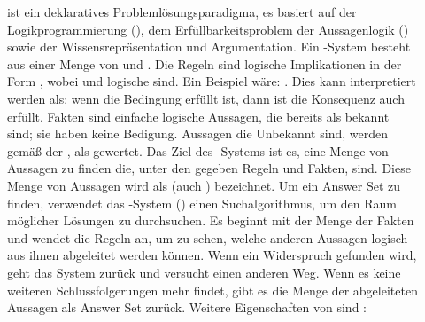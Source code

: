 \begin{description}
    \item[] ist ein deklaratives Problemlösungsparadigma, es basiert auf der Logikprogrammierung (), dem Erfüllbarkeitsproblem der Aussagenlogik () sowie der Wissensrepräsentation und Argumentation.
    Ein -System besteht aus einer Menge von  und .
    Die Regeln sind logische Implikationen in der Form , wobei  und  logische  sind.
    Ein Beispiel wäre: .
    Dies kann interpretiert werden als: wenn die Bedingung  erfüllt ist, dann ist die Konsequenz  auch erfüllt.
    Fakten sind einfache logische Aussagen, die bereits als  bekannt sind; sie haben keine Bedigung.
    Aussagen die Unbekannt sind, werden gemäß der , als  gewertet.
    Das Ziel des -Systems ist es, eine Menge von Aussagen zu finden die, unter den gegeben Regeln und Fakten,  sind.
    Diese Menge von Aussagen wird als  (auch ) bezeichnet.
    Um ein Answer Set zu finden, verwendet das -System () einen Suchalgorithmus, um den Raum möglicher Lösungen zu durchsuchen.
    Es beginnt mit der Menge der Fakten und wendet die Regeln an, um zu sehen, welche anderen Aussagen logisch aus ihnen abgeleitet werden können.
    Wenn ein Widerspruch gefunden wird, geht das System zurück und versucht einen anderen Weg.
    Wenn es keine weiteren Schlussfolgerungen mehr findet, gibt es die Menge der abgeleiteten Aussagen als Answer Set zurück.
    Weitere Eigenschaften von  sind \uA:
\end{description}


